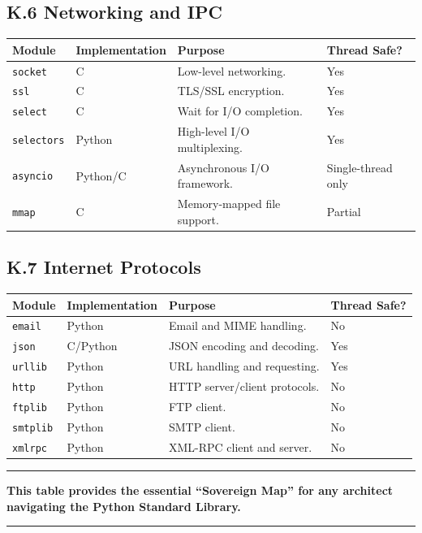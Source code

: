 \hypertarget{k.6-networking-and-ipc}{%
\subsection{K.6 Networking and IPC}\label{k.6-networking-and-ipc}}

\begin{longtable}[]{@{}llll@{}}
\toprule
Module & Implementation & Purpose & Thread Safe? \\
\midrule
\endhead
\passthrough{\lstinline!socket!} & C & Low-level networking. & Yes \\
\passthrough{\lstinline!ssl!} & C & TLS/SSL encryption. & Yes \\
\passthrough{\lstinline!select!} & C & Wait for I/O completion. & Yes \\
\passthrough{\lstinline!selectors!} & Python & High-level I/O
multiplexing. & Yes \\
\passthrough{\lstinline!asyncio!} & Python/C & Asynchronous I/O
framework. & Single-thread only \\
\passthrough{\lstinline!mmap!} & C & Memory-mapped file support. &
Partial \\
\bottomrule
\end{longtable}

\hypertarget{k.7-internet-protocols}{%
\subsection{K.7 Internet Protocols}\label{k.7-internet-protocols}}

\begin{longtable}[]{@{}llll@{}}
\toprule
Module & Implementation & Purpose & Thread Safe? \\
\midrule
\endhead
\passthrough{\lstinline!email!} & Python & Email and MIME handling. &
No \\
\passthrough{\lstinline!json!} & C/Python & JSON encoding and decoding.
& Yes \\
\passthrough{\lstinline!urllib!} & Python & URL handling and requesting.
& Yes \\
\passthrough{\lstinline!http!} & Python & HTTP server/client protocols.
& No \\
\passthrough{\lstinline!ftplib!} & Python & FTP client. & No \\
\passthrough{\lstinline!smtplib!} & Python & SMTP client. & No \\
\passthrough{\lstinline!xmlrpc!} & Python & XML-RPC client and server. &
No \\
\bottomrule
\end{longtable}

\begin{center}\rule{0.5\linewidth}{0.5pt}\end{center}

\textbf{This table provides the essential ``Sovereign Map'' for any
architect navigating the Python Standard Library.}

\begin{center}\rule{0.5\linewidth}{0.5pt}\end{center}
